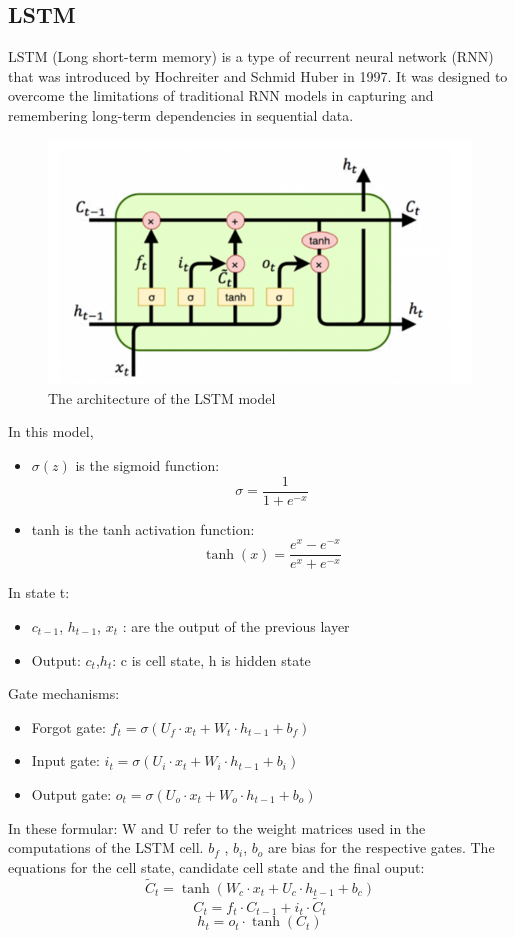 \documentclass[conference]{IEEEtran}
\begin{document}
\subsection{LSTM}
LSTM (Long short-term memory) is a type of recurrent neural network (RNN) that was introduced by Hochreiter and Schmid Huber in 1997. It was designed to overcome the limitations of traditional RNN models in capturing and remembering long-term dependencies in sequential data. \cite{LSTM}

\begin{figure}[H]
    \centering
    \begin{minipage}{0.8\linewidth}
    \centering
        \includegraphics[width=\linewidth]{images/LSTM.png}
    \caption{The architecture of the LSTM model}
    \label{fig9}
    \end{minipage}
\end{figure}
In this model,
\begin{itemize}
    \item $\sigma(z)$ is the sigmoid function:
    \[\sigma = \frac{1}{1 + e^{-x}}\]
    \item tanh is the tanh activation function:
    \[\tanh(x) = \frac{e^x - e^{-x}}{e^x + e^{-x}}\]
\end{itemize}
In state t:
\begin{itemize}
    \item $c_{t-1}$, $h_{t-1}$, $x_t$ : are the output of the previous layer
    \item Output: $c_t$,$h_t$: c is cell state, h is hidden state
\end{itemize}
Gate mechanisms:
\begin{itemize}
    \item Forgot gate: $f_t = \sigma(U_f \cdot x_t + W_t \cdot h_{t-1} + b_f)$
    \item Input gate: $i_t = \sigma(U_i \cdot x_t + W_i \cdot h_{t-1} + b_i)$
    \item Output gate: $o_t = \sigma(U_o \cdot x_t + W_o \cdot h_{t-1} + b_o)$
\end{itemize}
In these formular: W and U refer to the weight matrices used in the computations of the LSTM cell. $b_f$ , $b_i$, $b_o$ are bias for the respective gates.
The equations for the cell state, candidate cell state and the final ouput:
\[\tilde{C}_t = \tanh(W_c \cdot x_t + U_c \cdot h_{t-1} + b_c)\]
\[C_t = f_t \cdot C_{t-1} + i_t \cdot \tilde{C}_t\]
\[h_t = o_t \cdot \tanh(C_t)\]
\end{document}
